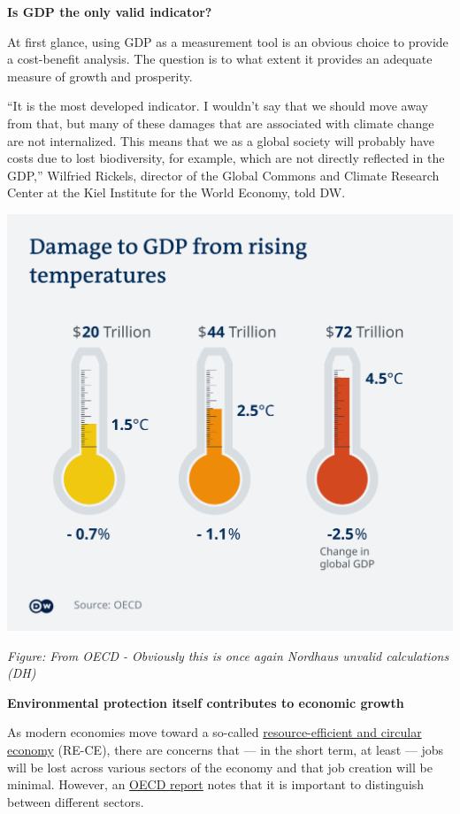 \documentclass[
]{book}
\begin{document}
\textbf{Is GDP the only valid indicator?}

At first glance, using GDP as a measurement tool is an obvious choice to provide a cost-benefit analysis. The question is to what extent it provides an adequate measure of growth and prosperity.

``It is the most developed indicator. I wouldn't say that we should move away from that, but many of these damages that are associated with climate change are not internalized. This means that we as a global society will probably have costs due to lost biodiversity, for example, which are not directly reflected in the GDP,'' Wilfried Rickels, director of the Global Commons and Climate Research Center at the Kiel Institute for the World Economy, told DW.

\includegraphics{fig/OECD_GDP_damage_from_temperature.png}

\emph{Figure: From OECD - Obviously this is once again Nordhaus unvalid calculations (DH)}

\textbf{Environmental protection itself contributes to economic growth}

As modern economies move toward a so-called
\href{https://www.oecd-ilibrary.org/docserver/c1f3c8d0-en.pdf}{resource-efficient and circular economy}
(RE-CE), there are concerns that --- in the short term, at least --- jobs will be lost across various sectors of the economy and that job creation will be minimal.
However, an \href{https://www.oecd-ilibrary.org/docserver/28e768df-en.pdf}{OECD report}
notes that it is important to distinguish between different sectors.
\end{document}
